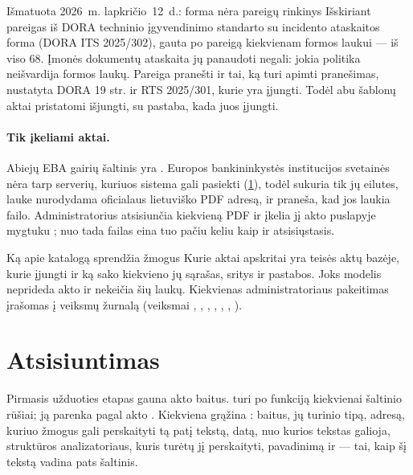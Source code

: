\begin{lessonbox}{Išmatuota 2026~m. lapkričio~12~d.: forma nėra pareigų rinkinys}
Išskiriant pareigas iš DORA techninio įgyvendinimo standarto su incidento ataskaitos forma
(DORA ITS 2025/302), gauta po pareigą kiekvienam formos laukui --- iš viso 68. Įmonės dokumentų
ataskaita jų panaudoti negali: jokia politika neišvardija formos laukų. Pareiga pranešti ir tai,
ką turi apimti pranešimas, nustatyta DORA 19 str. ir RTS 2025/301, kurie yra įjungti. Todėl abu
šablonų aktai pristatomi išjungti, su pastaba, kada juos įjungti.
\end{lessonbox}

\paragraph{Tik įkeliami aktai.} Abiejų EBA gairių šaltinis yra . Europos
bankininkystės institucijos svetainės nėra tarp serverių, kuriuos sistema gali pasiekti
(\cref{sec:corpus:fetch}), todėl  sukuria tik jų eilutes, 
lauke nurodydama oficialaus lietuviško PDF adresą, ir praneša, kad jos laukia failo.
Administratorius atsisiunčia kiekvieną PDF ir įkelia jį akto puslapyje mygtuku
; nuo tada failas eina tuo pačiu keliu kaip ir atsisiųstasis.

\begin{humanbox}{Ką apie katalogą sprendžia žmogus}
Kurie aktai apskritai yra teisės aktų bazėje, kurie įjungti ir ką sako kiekvieno jų
 sąrašas, sritys ir pastabos. Joks modelis neprideda akto ir nekeičia šių
laukų. Kiekvienas administratoriaus pakeitimas įrašomas į veiksmų žurnalą (veiksmai
, , , ,
, , ).
\end{humanbox}


\section{Atsisiuntimas}\label{sec:corpus:fetch}

Pirmasis užduoties etapas gauna akto baitus.  turi po funkciją
kiekvienai šaltinio rūšiai;  ją parenka pagal akto .
Kiekviena grąžina : baitus, jų turinio tipą, adresą, kuriuo žmogus gali
perskaityti tą patį tekstą, datą, nuo kurios tekstas galioja, struktūros analizatoriaus, kuris
turėtų jį perskaityti, pavadinimą ir  --- tai, kaip šį tekstą vadina pats
šaltinis.

